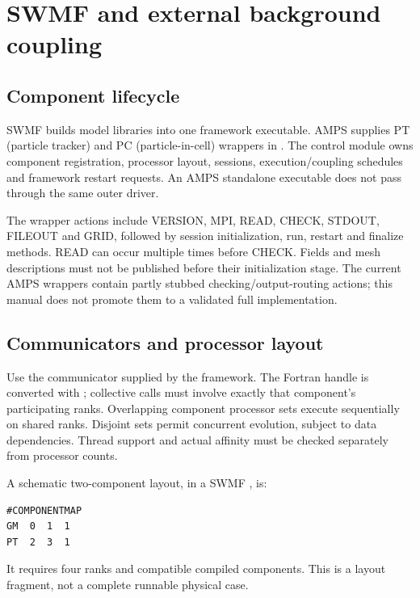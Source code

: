 \chapter{SWMF and external background coupling}\label{ch:coupling}
\section{Component lifecycle}
SWMF builds model libraries into one framework executable. AMPS supplies PT
(particle tracker) and PC (particle-in-cell) wrappers in .
The control module owns component registration, processor layout, sessions,
execution/coupling schedules and framework restart requests.
An AMPS standalone executable does not pass through the same outer driver.

The wrapper actions include VERSION, MPI, READ, CHECK, STDOUT, FILEOUT and
GRID, followed by session initialization, run, restart and finalize methods.
READ can occur multiple times before CHECK. Fields and mesh descriptions
must not be published before their initialization stage. The current AMPS
wrappers contain partly stubbed checking/output-routing actions; this manual
does not promote them to a validated full implementation.

\section{Communicators and processor layout}
Use the communicator supplied by the framework. The Fortran handle is
converted with ; collective calls must involve exactly
that component's participating ranks. Overlapping component processor sets
execute sequentially on shared ranks. Disjoint sets permit concurrent
evolution, subject to data dependencies. Thread support and actual affinity
must be checked separately from processor counts.

A schematic two-component layout, in a SWMF , is:
\begin{lstlisting}
#COMPONENTMAP
GM  0  1  1
PT  2  3  1
\end{lstlisting}
It requires four ranks and compatible compiled components. This is a layout
fragment, not a complete runnable physical case.

